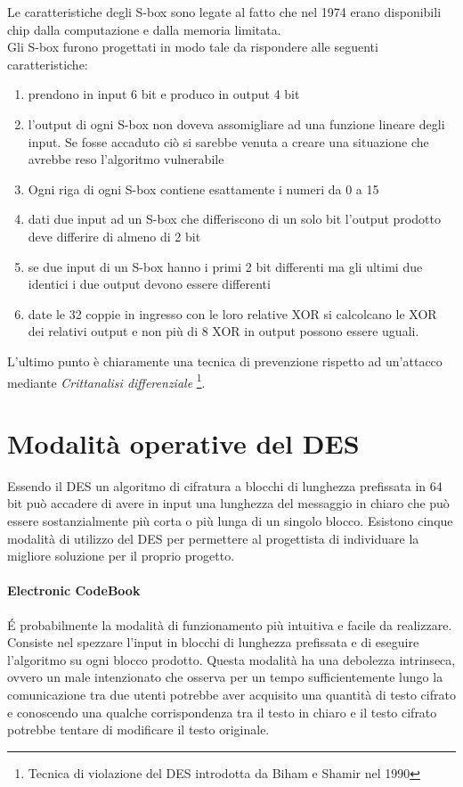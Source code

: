 \documentclass[11pt, a4paper, oneside]{Thesis} %
\begin{document}
\newpage
Le caratteristiche degli S-box sono legate al fatto che nel 1974 erano disponibili chip dalla computazione e dalla memoria limitata. 
\\Gli S-box furono progettati in modo tale da rispondere alle seguenti caratteristiche: 
\begin{enumerate}
 \item prendono in input 6 bit e produco in output 4 bit
 \item l'output di ogni S-box non doveva assomigliare ad una funzione lineare degli input. Se fosse accaduto ciò si sarebbe venuta a creare
 una situazione che avrebbe reso l'algoritmo vulnerabile
 \item Ogni riga di ogni S-box contiene esattamente i numeri da 0 a 15
 \item dati due input ad un S-box che differiscono di un solo bit l'output prodotto deve differire di almeno di 2 bit
 \item se due input di un S-box hanno i primi 2 bit differenti ma gli ultimi due identici i due output devono essere differenti
 \item date le 32 coppie in ingresso con le loro relative XOR si calcolcano le XOR dei relativi output e non più di 8 XOR in output possono essere uguali. 
\end{enumerate}
L'ultimo punto è chiaramente una tecnica di prevenzione rispetto ad un'attacco mediante \textit{Crittanalisi differenziale}
\footnote{Tecnica di violazione del DES introdotta da Biham e Shamir nel 1990}.

\section{Modalità operative del DES}
Essendo il DES un algoritmo di cifratura a blocchi di lunghezza prefissata in 64 bit può accadere di avere in input una lunghezza del messaggio in chiaro che può essere
sostanzialmente più corta o più lunga di un singolo blocco. Esistono cinque modalità di utilizzo del DES per permettere al progettista di individuare la migliore soluzione 
per il proprio progetto.

\paragraph{Electronic CodeBook} \'E probabilmente la modalità di funzionamento più intuitiva e facile da realizzare. Consiste nel spezzare l'input in blocchi di lunghezza
prefissata e di eseguire l'algoritmo su ogni blocco prodotto. Questa modalità ha una debolezza intrinseca, ovvero un male intenzionato che osserva per un tempo sufficientemente
lungo la comunicazione tra due utenti potrebbe aver acquisito una quantità di testo cifrato e conoscendo una qualche corrispondenza tra il testo in chiaro e il testo cifrato
potrebbe tentare di modificare il testo originale.
\end{document}
